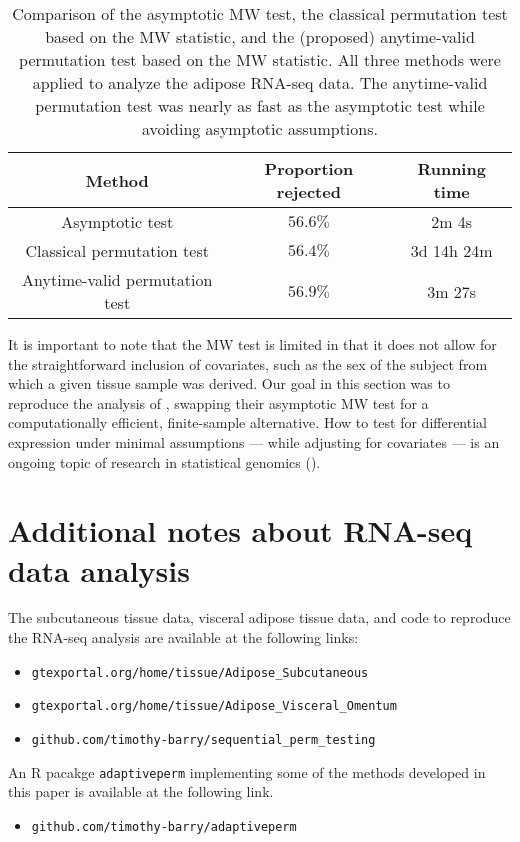 \documentclass[12pt]{article}
\begin{document}
	\begin{table}\caption{Comparison of the asymptotic MW test, the classical permutation test based on the MW statistic, and the (proposed) anytime-valid permutation test based on the MW statistic. All three methods were applied to analyze the adipose RNA-seq data. The anytime-valid permutation test was nearly as fast as the asymptotic test while avoiding asymptotic assumptions.}
	\centering
	\begin{tabular}{|c|c|c|}
		\hline
		\textbf{Method} & \textbf{Proportion rejected} & \textbf{Running time} \\
		\hline
		Asymptotic test & $56.6\%$  & 2m 4s \\
		\hline
		Classical permutation test & $56.4\%$  & 3d 14h 24m  \\
		\hline
		Anytime-valid permutation test & $56.9\%$ & 3m 27s \\
		\hline
	\end{tabular}
	\end{table}
	
	It is important to note that the MW test is limited in that it does not allow for the straightforward inclusion of covariates, such as the sex of the subject from which a given tissue sample was derived. Our goal in this section was to reproduce the analysis of \cite{Li2022}, swapping their asymptotic MW test for a computationally efficient, finite-sample alternative. How to test for differential expression under minimal assumptions --- while adjusting for covariates --- is an ongoing topic of research in statistical genomics (\cite{Niu2024}).
	
	\section{Additional notes about RNA-seq data analysis}
	
	The subcutaneous tissue data, visceral adipose tissue data, and code to reproduce the RNA-seq analysis are available at the following links:
	\begin{itemize}
		\item \texttt{gtexportal.org/home/tissue/Adipose\_Subcutaneous}
		\item \texttt{gtexportal.org/home/tissue/Adipose\_Visceral\_Omentum}
		\item \texttt{github.com/timothy-barry/sequential\_perm\_testing}
	\end{itemize}
	 An R pacakge \texttt{adaptiveperm} implementing some of the methods developed in this paper is available at the following link.
	\begin{itemize}
		\item \texttt{github.com/timothy-barry/adaptiveperm}
	\end{itemize}
	
\end{document}
